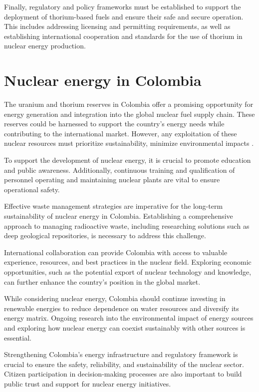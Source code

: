 Finally, regulatory and policy frameworks must be established to support the deployment of thorium-based fuels and ensure their safe and secure operation. This includes addressing licensing and permitting requirements, as well as establishing international cooperation and standards for the use of thorium in nuclear energy production.

\section{Nuclear energy in Colombia}

The uranium and thorium reserves in Colombia offer a promising opportunity for energy generation and integration into the global nuclear fuel supply chain. These reserves could be harnessed to support the country's energy needs while contributing to the international market. However, any exploitation of these nuclear resources must prioritize sustainability, minimize environmental impacts \cite{UraniumGlobal,ReservasUranio}.

To support the development of nuclear energy, it is crucial to promote education and public awareness. Additionally, continuous training and qualification of personnel operating and maintaining nuclear plants are vital to ensure operational safety.

Effective waste management strategies are imperative for the long-term sustainability of nuclear energy in Colombia. Establishing a comprehensive approach to managing radioactive waste, including researching solutions such as deep geological repositories, is necessary to address this challenge.

International collaboration can provide Colombia with access to valuable experience, resources, and best practices in the nuclear field. Exploring economic opportunities, such as the potential export of nuclear technology and knowledge, can further enhance the country's position in the global market.

While considering nuclear energy, Colombia should continue investing in renewable energies to reduce dependence on water resources and diversify its energy matrix. Ongoing research into the environmental impact of energy sources and exploring how nuclear energy can coexist sustainably with other sources is essential.

Strengthening Colombia's energy infrastructure and regulatory framework is crucial to ensure the safety, reliability, and sustainability of the nuclear sector. Citizen participation in decision-making processes are also important to build public trust and support for nuclear energy initiatives.

